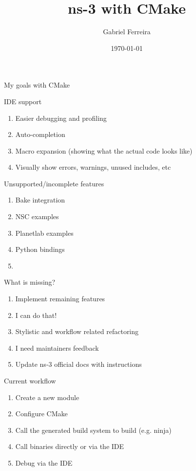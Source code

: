 \documentclass[12pt]{beamer}
\title{ns-3 with CMake}
\author{Gabriel Ferreira}
\date{\today}
\institute{University of Brasília}
\begin{document}
\maketitle

\begin{frame}{My goals with CMake}
    
    IDE support
    \begin{enumerate}
        \item Easier debugging and profiling
        \item Auto-completion
        \item Macro expansion (showing what the actual code looks like)
        \item Visually show errors, warnings, unused includes, etc
    \end{enumerate}
\end{frame}

\begin{frame}{Unsupported/incomplete features}
    \begin{enumerate}
        \item Bake integration
        \item NSC examples
        \item Planetlab examples
        \item Python bindings 
        \item[] \hspace{1em}{\footnotesize The code is there, but apiscan and generation fail for some modules}
    \end{enumerate}
\end{frame}

\begin{frame}{What is missing?}
    \begin{enumerate}
        \item Implement remaining features
        \item[] \hspace{1em} {\footnotesize I can do that!}
        \item Stylistic and workflow related refactoring
        \item[] \hspace{1em} {\footnotesize I need maintainers feedback}
        \item Update ns-3 official docs with instructions
    \end{enumerate}
\end{frame}   

\begin{frame}{Current workflow}
    \begin{enumerate}
        \item Create a new module
        \item Configure CMake
        \item Call the generated build system to build (e.g. ninja)
        \item Call binaries directly or via the IDE
        \item Debug via the IDE
    \end{enumerate}
\end{frame} 
\end{document}
